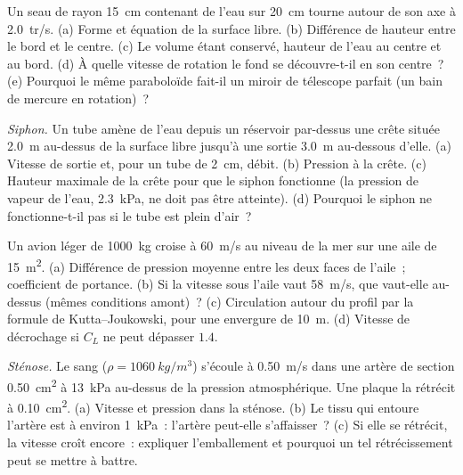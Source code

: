 \begin{exercise}[$\star\star$]\label{exo:b2:euler-bernoulli:6}
Un seau de rayon \qty{15}{cm} contenant de l'eau sur \qty{20}{cm} tourne
autour de son axe à \qty{2.0}{tr/s}. (a) Forme et équation de la surface
libre. (b) Différence de hauteur entre le bord et le centre. (c) Le volume étant
conservé, hauteur de l'eau au centre et au bord. (d) À
quelle vitesse de rotation le fond se découvre-t-il en son centre~? (e) Pourquoi le
même paraboloïde fait-il un miroir de télescope parfait (un bain de mercure en rotation)~?
\end{exercise}

\begin{exercise}[$\star\star$]\label{exo:b2:euler-bernoulli:7}
\emph{Siphon.} Un tube amène de l'eau depuis un réservoir par-dessus une crête située \qty{2.0}{m}
au-dessus de la surface libre jusqu'à une sortie \qty{3.0}{m} au-dessous d'elle. (a) Vitesse de sortie
et, pour un tube de \qty{2}{cm}, débit. (b) Pression à la crête. (c)
Hauteur maximale de la crête pour que le siphon fonctionne (la pression de vapeur
de l'eau, \qty{2.3}{kPa}, ne doit pas être atteinte). (d) Pourquoi le siphon
ne fonctionne-t-il pas si le tube est plein d'air~?
\end{exercise}

\begin{exercise}[$\star\star$]\label{exo:b2:euler-bernoulli:8}
Un avion léger de \qty{1000}{kg} croise à \qty{60}{m/s} au niveau de la mer sur
une aile de \qty{15}{m^2}. (a) Différence de pression moyenne entre les deux
faces de l'aile~; coefficient de portance. (b) Si la vitesse sous l'aile vaut
\qty{58}{m/s}, que vaut-elle au-dessus (mêmes conditions
amont)~? (c) Circulation autour du profil par la formule de
Kutta--Joukowski, pour une envergure de \qty{10}{m}. (d) Vitesse de décrochage si
$C_L$ ne peut dépasser $1.4$.
\end{exercise}

\begin{exercise}[$\star\star$]\label{exo:b2:euler-bernoulli:9}
\emph{Sténose.} Le sang ($\rho = \qty{1060}{kg/m^3}$) s'écoule à \qty{0.50}{m/s}
dans une artère de section \qty{0.50}{cm^2} à \qty{13}{kPa} au-dessus de la pression
atmosphérique. Une plaque la rétrécit à \qty{0.10}{cm^2}. (a) Vitesse et pression
dans la sténose. (b) Le tissu qui entoure l'artère est à environ
\qty{1}{kPa}~: l'artère peut-elle s'affaisser~? (c) Si elle se rétrécit, la vitesse
croît encore~: expliquer l'emballement et pourquoi un tel rétrécissement peut se mettre à battre.
\end{exercise}

